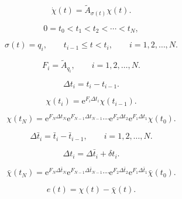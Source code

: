 \documentclass[12pt]{article}
\newcommand{\e}{\mathrm{e}}
\begin{document}
\begin{equation}
    \boxed{
        \dot{\chi}(t)=\widetilde A_{\sigma(t)}\chi(t)
    }.
    \label{eq:augmented-system}
\end{equation}

\begin{equation}
    0=t_0<t_1<t_2<\cdots<t_N,
    \label{eq:boundaries}
\end{equation}

\begin{equation}
    \sigma(t)=q_i,
    \qquad t_{i-1}\leq t<t_i,
    \qquad i=1,2,\ldots,N.
    \label{eq:mode-intervals}
\end{equation}

\begin{equation}
    F_i=\widetilde A_{q_i},
    \qquad i=1,2,\ldots,N.
    \label{eq:Fi}
\end{equation}

\begin{equation}
    \Delta t_i=t_i-t_{i-1}.
    \label{eq:actual-duration}
\end{equation}

\begin{equation}
    \chi(t_i)=\e^{F_i\Delta t_i}\chi(t_{i-1}).
    \label{eq:one-interval-propagation}
\end{equation}

\begin{equation}
\boxed{
    \chi(t_N)
    =\e^{F_N\Delta t_N}
     \e^{F_{N-1}\Delta t_{N-1}}
     \cdots
     \e^{F_2\Delta t_2}
     \e^{F_1\Delta t_1}
     \chi(t_0)
    }.
    \label{eq:actual-cycle}
\end{equation}

\begin{equation}
    \Delta\bar t_i=\bar t_i-\bar t_{i-1},
    \qquad i=1,2,\ldots,N.
    \label{eq:nominal-duration}
\end{equation}

\begin{equation}
    \Delta t_i=\Delta\bar t_i+\delta t_i.
    \label{eq:duration-perturbation}
\end{equation}

\begin{equation}
\boxed{
    \bar\chi(t_N)
    =\e^{F_N\Delta\bar t_N}
     \e^{F_{N-1}\Delta\bar t_{N-1}}
     \cdots
     \e^{F_2\Delta\bar t_2}
     \e^{F_1\Delta\bar t_1}
     \bar\chi(t_0)
    }.
    \label{eq:nominal-cycle}
\end{equation}

\begin{equation}
    e(t)=\chi(t)-\bar\chi(t).
    \label{eq:error}
\end{equation}
\end{document}
